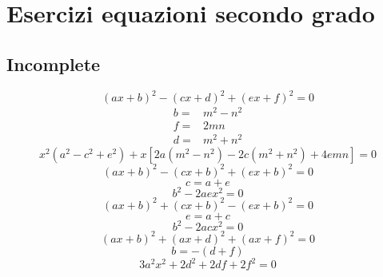 \chapter{Esercizi equazioni secondo grado}\label{ch:Esercizi-equazioni-secondo-grado}
\section{Incomplete}\label{sec:Equacomplete}
\begin{equation}
	(ax+b)^2-(cx+d)^2+(ex+f)^2=0
\end{equation}
\begin{align*}
	b=&m^2-n^2\\
	f=&2mn\\
	d=&m^2+n^2
\end{align*}
\begin{equation*}
x^2(a^2 - c^2 + e^2) + x[2a(m^2 - n^2) - 2c(m^2 + n^2) + 4emn]=0
\end{equation*}
\begin{equation}
	(ax+b)^2-(cx+b)^2+(ex+b)^2=0
\end{equation}
\[c=a+e\]
\begin{equation*}
b^2 - 2aex^2=0
\end{equation*}
\begin{equation}
	(ax+b)^2+(cx+b)^2-(ex+b)^2=0
\end{equation}
\[e=a+c\]
\begin{equation*}
	b^2 - 2acx^2=0
\end{equation*}
\begin{equation}
	(ax+b)^2+(ax+d)^2+(ax+f)^2=0
\end{equation}
\[b=-(d+f)\]
\begin{equation*}
3a^2x^2 + 2d^2 + 2df + 2f^2=0
\end{equation*}